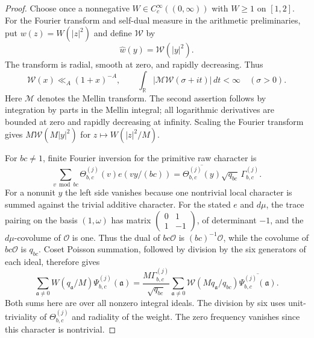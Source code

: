 \documentclass[11pt,a4paper]{article}
\numberwithin{equation}{section}
\numberwithin{figure}{section}
\theoremstyle{definition}
\theoremstyle{remark}
\begin{document}
\begin{proof}
Choose once a nonnegative $W\in C_c^\infty((0,\infty))$ with $W\ge1$ on
$[1,2]$.  For the Fourier transform and self-dual measure in the arithmetic
preliminaries, put $w(z)=W(|z|^2)$ and define $\mathscr W$ by
\[
 \widehat w(y)=\mathscr W(|y|^2).
\]
The transform is radial, smooth at zero, and rapidly decreasing.  Thus
\begin{equation}\label{eq:sextic-sieve-transform-bounds}
 \mathscr W(x)\ll_A(1+x)^{-A},\qquad
 \int_{\mathbb R}|\mathcal M\mathscr W(\sigma+it)|\,dt<\infty
       \quad(\sigma>0).
\end{equation}
Here $\mathcal M$ denotes the Mellin transform.  The second assertion
follows by integration by parts in the Mellin integral; all logarithmic
derivatives are bounded at zero and rapidly
decreasing at infinity.  Scaling the Fourier transform gives
$M\mathscr W(M|y|^2)$ for $z\mapsto W(|z|^2/M)$.

For $bc\ne1$, finite Fourier inversion for the primitive raw character is
\[
 \sum_{v\bmod bc}\Theta_{b,c}^{(j)}(v)e(vy/(bc))
 =\overline{\Theta_{b,c}^{(j)}(y)}\sqrt{q_{bc}}\,
       \Gamma_{b,c}^{(j)}.
\]
For a nonunit $y$ the left side vanishes because one nontrivial local
character is summed against the trivial additive character.  For the stated
$e$ and $d\mu$, the trace pairing on the basis $(1,\omega)$ has matrix
$\left(\begin{smallmatrix}0&1\\1&-1\end{smallmatrix}\right)$, of determinant
$-1$, and the $d\mu$-covolume of $\mathcal O$ is one.  Thus the dual of
$bc\mathcal O$ is $(bc)^{-1}\mathcal O$, while the covolume of
$bc\mathcal O$ is $q_{bc}$.
Coset Poisson summation, followed by division by the six generators of
each ideal, therefore gives
\begin{equation}\label{eq:sextic-sieve-pair-poisson}
 \sum_{\mathfrak a\ne0}W(q_{\mathfrak a}/M)\Psi_{b,c}^{(j)}(\mathfrak a)
 =\frac{M\Gamma_{b,c}^{(j)}}{\sqrt{q_{bc}}}
   \sum_{\mathfrak a\ne0}\mathscr W(Mq_{\mathfrak a}/q_{bc})
                 \overline{\Psi_{b,c}^{(j)}(\mathfrak a)}.
\end{equation}
Both sums here are over all nonzero integral ideals.  The division by six
uses unit-triviality of $\Theta_{b,c}^{(j)}$ and radiality of the weight.
The zero frequency vanishes since this character is nontrivial.


\end{proof}
\end{document}
